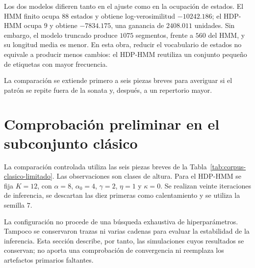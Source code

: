 \begin{table}[H]
\centering
\small
\setlength{\tabcolsep}{4pt}

\caption{Comparación entre el HMM finito y el HDP-HMM truncado en la obra de referencia: el tercer movimiento de la Sonata núm.~14 de Beethoven.}
\label{tab:single-anchor}
\end{table}

Los dos modelos difieren tanto en el ajuste como en la ocupación de estados. El HMM finito ocupa $88$ estados y obtiene log-verosimilitud $-10242.186$; el HDP-HMM ocupa $9$ y obtiene $-7834.175$, una ganancia de $2408.011$ unidades. Sin embargo, el modelo truncado produce $1075$ segmentos, frente a $560$ del HMM, y su longitud media es menor. En esta obra, reducir el vocabulario de estados no equivale a producir menos cambios: el HDP-HMM reutiliza un conjunto pequeño de etiquetas con mayor frecuencia.

La comparación se extiende primero a seis piezas breves para averiguar si el patrón se repite fuera de la sonata y, después, a un repertorio mayor.

\section{Comprobación preliminar en el subconjunto clásico}

La comparación controlada utiliza las seis piezas breves de la Tabla~\ref{tab:corpus-clasico-limitado}. Las observaciones son clases de altura. Para el HDP-HMM se fija $K=12$, con $\alpha=8$, $\alpha_0=4$, $\gamma=2$, $\eta=1$ y $\kappa=0$. Se realizan veinte iteraciones de inferencia, se descartan las diez primeras como calentamiento y se utiliza la semilla $7$.

La configuración no procede de una búsqueda exhaustiva de hiperparámetros. Tampoco se conservaron trazas ni varias cadenas para evaluar la estabilidad de la inferencia. Esta sección describe, por tanto, las simulaciones cuyos resultados se conservan; no aporta una comprobación de convergencia ni reemplaza los artefactos primarios faltantes.

\begin{table}[H]
\centering
\footnotesize
\setlength{\tabcolsep}{4pt}

\caption{Subconjunto clásico limitado utilizado para la comparación documentada entre el HMM finito y el HDP-HMM truncado.}
\label{tab:corpus-clasico-limitado}
\end{table}

